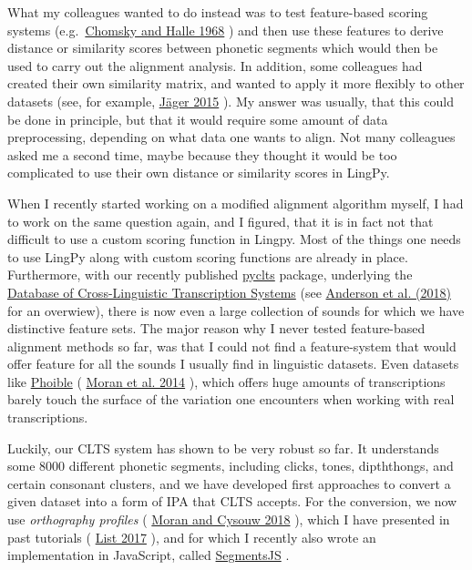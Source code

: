\documentclass[
  a4paper,
  14pt,
  oneside,
  tablecaptionabove
]{scrbook}
\begin{document}
What my colleagues wanted to do instead was to test feature-based
scoring systems
(e.g.~\href{http://bibliography.lingpy.org?key=Chomsky1968}{Chomsky and
Halle 1968} ) and then use these features to derive distance or
similarity scores between phonetic segments which would then be used to
carry out the alignment analysis. In addition, some colleagues had
created their own similarity matrix, and wanted to apply it more
flexibly to other datasets (see, for example,
\href{http://bibliography.lingpy.org?key=Jaeger2015}{Jäger 2015} ). My
answer was usually, that this could be done in principle, but that it
would require some amount of data preprocessing, depending on what data
one wants to align. Not many colleagues asked me a second time, maybe
because they thought it would be too complicated to use their own
distance or similarity scores in LingPy.

When I recently started working on a modified alignment algorithm
myself, I had to work on the same question again, and I figured, that it
is in fact not that difficult to use a custom scoring function in
Lingpy. Most of the things one needs to use LingPy along with custom
scoring functions are already in place. Furthermore, with our recently
published \href{https://github.com/cldf/clts}{pyclts} package,
underlying the \href{https://clts.clld.org}{Database of Cross-Linguistic
Transcription Systems} (see
\href{http://bibliography.lingpy.org?key=Anderson2018}{Anderson et al.
(2018)} for an overwiew), there is now even a large collection of sounds
for which we have distinctive feature sets. The major reason why I never
tested feature-based alignment methods so far, was that I could not find
a feature-system that would offer feature for all the sounds I usually
find in linguistic datasets. Even datasets like
\href{https://phoible.org}{Phoible} (
\href{http://bibliography.lingpy.org?key=Moran2014}{Moran et al. 2014}
), which offers huge amounts of transcriptions barely touch the surface
of the variation one encounters when working with real transcriptions.

Luckily, our CLTS system has shown to be very robust so far. It
understands some 8000 different phonetic segments, including clicks,
tones, dipththongs, and certain consonant clusters, and we have
developed first approaches to convert a given dataset into a form of IPA
that CLTS accepts. For the conversion, we now use \emph{orthography
profiles} ( \href{http://bibliography.lingpy.org?key=Moran2018}{Moran
and Cysouw 2018} ), which I have presented in past tutorials (
\href{http://bibliography.lingpy.org?key=List2017LECTUREd}{List 2017} ),
and for which I recently also wrote an implementation in JavaScript,
called \href{http://calc.digling.org/}{SegmentsJS} .
\end{document}
